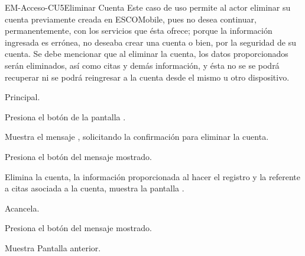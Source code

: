 	\begin{UseCase}{EM-Acceso-CU5}{Eliminar Cuenta}{
		\noindent
		Este caso de uso permite al actor eliminar su cuenta previamente creada en ESCOMobile, pues no desea
		continuar, permanentemente, con los servicios que ésta ofrece; porque la información ingresada es errónea,
		no deseaba crear una cuenta o bien, por la seguridad de su cuenta. Se debe mencionar que al eliminar
		la cuenta, los datos proporcionados serán eliminados, así como citas y demás información, y ésta no se
		se podrá recuperar ni se podrá reingresar a la cuenta desde el mismo u otro dispositivo.
		\newline
		}
	\end{UseCase}
	
	\begin{UCtrayectoria}{Principal.}

		\UCpaso[\UCactor] Presiona el botón  de la pantalla .

		\UCpaso Muestra el mensaje , solicitando la confirmación para eliminar la cuenta.

		\UCpaso [\UCactor] Presiona el botón  del mensaje mostrado. 

		\UCpaso Elimina la cuenta, la información proporcionada al hacer el registro y la referente a citas asociada a la cuenta, muestra la pantalla .

	\end{UCtrayectoria}

\begin{UCtrayectoriaA}{A}{cancela.}

		\UCpaso	Presiona el botón  del mensaje mostrado.

		\UCpaso Muestra Pantalla anterior.

\end{UCtrayectoriaA}


